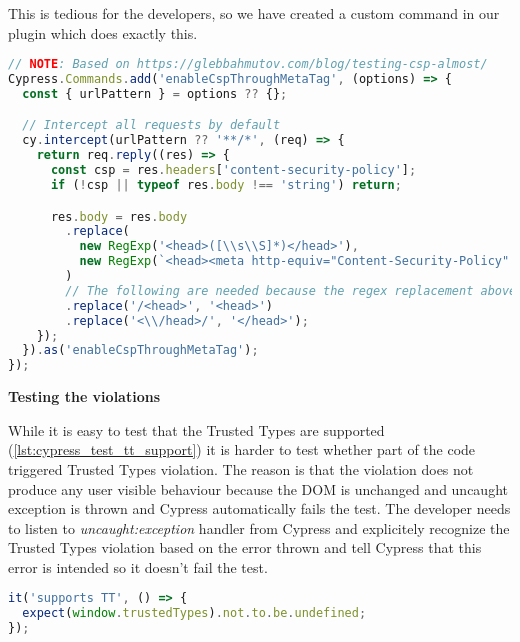 This is tedious for the developers, so we have created a custom command in our plugin which does
exactly this.

\bigskip
\begin{lstlisting}[language=JavaScript, caption=Intercept requests and enable CSP header inside via meta tag]
// NOTE: Based on https://glebbahmutov.com/blog/testing-csp-almost/
Cypress.Commands.add('enableCspThroughMetaTag', (options) => {
  const { urlPattern } = options ?? {};

  // Intercept all requests by default
  cy.intercept(urlPattern ?? '**/*', (req) => {
    return req.reply((res) => {
      const csp = res.headers['content-security-policy'];
      if (!csp || typeof res.body !== 'string') return;

      res.body = res.body
        .replace(
          new RegExp('<head>([\\s\\S]*)</head>'),
          new RegExp(`<head><meta http-equiv="Content-Security-Policy" content="${csp}">$1</head>`).toString()
        )
        // The following are needed because the regex replacement above inserts some characters
        .replace('/<head>', '<head>')
        .replace('<\\/head>/', '</head>');
    });
  }).as('enableCspThroughMetaTag');
});
\end{lstlisting}

\begin{flushleft}\textbf {Testing the violations}\end{flushleft}

While it is easy to test that the Trusted Types are supported (\ref{lst:cypress_test_tt_support}) it
is harder to test whether part of the code triggered Trusted Types violation. The reason is that the
violation does not produce any user visible behaviour because the DOM is unchanged and uncaught
exception is thrown and Cypress automatically fails the test. The developer needs to listen to
\textit{uncaught:exception} handler from Cypress and explicitely recognize the Trusted Types
violation based on the error thrown and tell Cypress that this error is intended so it doesn't fail
the test.

\bigskip
\bigskip
\begin{lstlisting}[language=JavaScript, caption=Test Trusted Types support, label={lst:cypress_test_tt_support}]
it('supports TT', () => {
  expect(window.trustedTypes).not.to.be.undefined;
});
\end{lstlisting}

